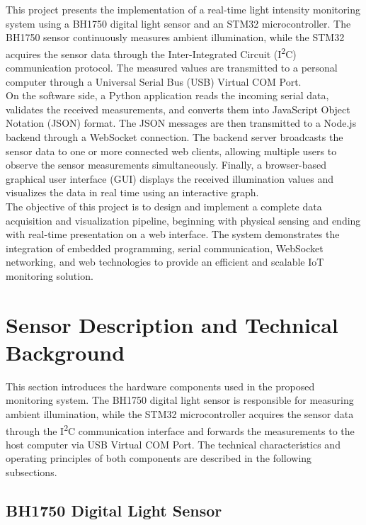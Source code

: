 \documentclass[11pt]{article}
\begin{document}
This project presents the implementation of a real-time light intensity monitoring system using a BH1750 digital light sensor and an STM32 microcontroller. The BH1750 sensor continuously measures ambient illumination, while the STM32 acquires the sensor data through the Inter-Integrated Circuit (I\textsuperscript{2}C) communication protocol. The measured values are transmitted to a personal computer through a Universal Serial Bus (USB) Virtual COM Port.\\[0.1em]

On the software side, a Python application reads the incoming serial data, validates the received measurements, and converts them into JavaScript Object Notation (JSON) format. The JSON messages are then transmitted to a Node.js backend through a WebSocket connection. The backend server broadcasts the sensor data to one or more connected web clients, allowing multiple users to observe the sensor measurements simultaneously. Finally, a browser-based graphical user interface (GUI) displays the received illumination values and visualizes the data in real time using an interactive graph.\\[0.1em]

The objective of this project is to design and implement a complete data acquisition and visualization pipeline, beginning with physical sensing and ending with real-time presentation on a web interface. The system demonstrates the integration of embedded programming, serial communication, WebSocket networking, and web technologies to provide an efficient and scalable IoT monitoring solution.


\section{Sensor Description and Technical Background}

This section introduces the hardware components used in the proposed monitoring system. The BH1750 digital light sensor is responsible for measuring ambient illumination, while the STM32 microcontroller acquires the sensor data through the I\textsuperscript{2}C communication interface and forwards the measurements to the host computer via USB Virtual COM Port. The technical characteristics and operating principles of both components are described in the following subsections.

\subsection{BH1750 Digital Light Sensor}
\end{document}
